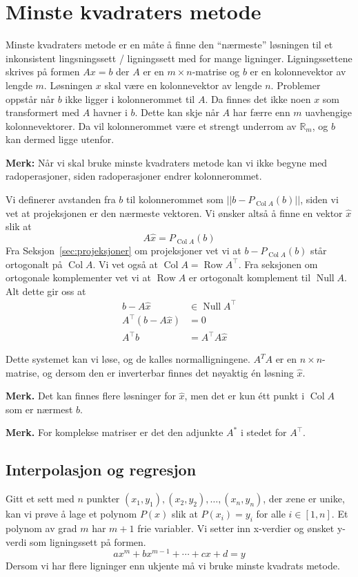 \documentclass[12pt,a4paper,norsk]{article}
\newcommand{\R}{\mathbb{R}}
\DeclareMathOperator{\Col}{Col} %
\DeclareMathOperator{\Row}{Row}
\DeclareMathOperator{\Null}{Null}
\begin{document}
\section{Minste kvadraters metode}\label{sec:minste_kvadraters_metode}
Minste kvadraters metode er en måte å finne den ``nærmeste'' løsningen til et
inkonsistent lingsningssett / ligningssett med for mange ligninger.
Ligningssettene skrives på formen $Ax = b$ der $A$ er en $m \times n$-matrise og $b$
er en kolonnevektor av lengde $m$. Løsningen $x$ skal være en kolonnevektor av
lengde $n$. Problemer oppstår når $b$ ikke ligger i kolonnerommet til $A$. Da
finnes det ikke noen $x$ som transformert med $A$ havner i $b$. Dette kan skje når
$A$ har færre enn $m$ uavhengige kolonnevektorer. Da vil kolonnerommet være et strengt
underrom av $\R_{m}$, og $b$ kan dermed ligge utenfor.

\textbf{Merk:} Når vi skal bruke minste kvadraters metode kan vi ikke begyne med
radoperasjoner, siden radoperasjoner endrer kolonnerommet.

Vi definerer avstanden fra $b$ til kolonnerommet som $||b-P_{\Col A}(b)||$,
siden vi vet at projeksjonen er den nærmeste vektoren. Vi ønsker altså å finne
en vektor $\hat{x}$ slik at
\[A\hat{x} = P_{\Col A}(b)\]
Fra Seksjon~\ref{sec:projeksjoner} om projeksjoner vet vi at $b-P_{\Col A}(b)$ står
ortogonalt på $\Col A$. Vi vet også at $\Col A = \Row A^{\top}$. Fra seksjonen om
ortogonale komplementer vet vi at $\Row A$ er ortogonalt komplement til $\Null
A$. Alt dette gir oss at
\begin{align*}
  b-A\hat{x} &\in \Null A^{\top} \\
  A^{\top}(b-A\hat{x}) &= 0 \\
  A^{\top}b &= A^{\top}A\hat{x}
\end{align*}

Dette systemet kan vi løse, og de kalles normalligningene. $A^{T}A$ er en $n\times
n$-matrise, og dersom den er inverterbar finnes det nøyaktig én løsning
$\hat{x}$.

\textbf{Merk.} Det kan finnes flere løsninger for $\hat{x}$, men det er kun étt
punkt i $\Col A$ som er nærmest $b$.

\textbf{Merk.} For komplekse matriser er det den adjunkte $A^{*}$ i stedet for $A^{\top}$.

\subsection{Interpolasjon og regresjon}
Gitt et sett med $n$ punkter
$(x_{1}, y_{1}), (x_{2}, y_{2}), \ldots, (x_{n}, y_{n})$, der $x$ene er unike, kan
vi prøve å lage et polynom $P(x)$ slik at $P(x_{i}) = y_{i}$ for alle $i \in [1,n]$.
Et polynom av grad $m$ har $m+1$ frie variabler. Vi setter inn x-verdier og
ønsket y-verdi som ligningssett på formen.
\[ax^{m} + bx^{m-1} + \cdots + cx + d = y\]
Dersom vi har flere ligninger enn ukjente må vi bruke minste kvadrats metode.
\end{document}
